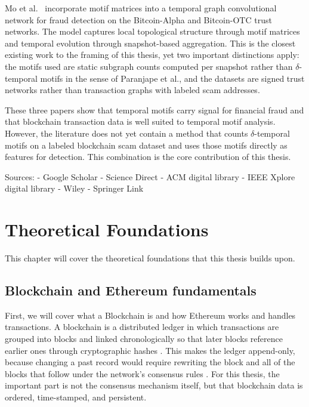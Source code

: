 \documentclass{thesisclass}
\begin{document}
Mo et al.~\cite{mo2022motifgcn} incorporate motif matrices into a
temporal graph convolutional network for fraud detection on the
Bitcoin-Alpha and Bitcoin-OTC trust networks. The model captures local
topological structure through motif matrices and temporal evolution
through snapshot-based aggregation. This is the closest existing work to
the framing of this thesis, yet two important distinctions apply: the
motifs used are static subgraph counts computed per snapshot rather than
$\delta$-temporal motifs in the sense of Paranjape et al., and the
datasets are signed trust networks rather than transaction graphs with
labeled scam addresses.

These three papers show that temporal motifs carry signal for financial fraud and that blockchain
transaction data is well suited to temporal motif analysis. However, the
literature does not yet contain a method that counts $\delta$-temporal
motifs on a labeled blockchain scam dataset and uses those motifs directly as features for detection. This combination is the
core contribution of this thesis.

Sources: 
- Google Scholar
- Science Direct
- ACM digital library
- IEEE Xplore digital library
- Wiley
- Springer Link





\chapter{Theoretical Foundations}
This chapter will cover the theoretical foundations that this thesis builds upon.

\section{Blockchain and Ethereum fundamentals}
First, we will cover what a Blockchain is and how Ethereum works and handles transactions. 
A blockchain is a distributed ledger in which transactions are grouped into blocks and linked chronologically so that later blocks reference earlier ones through cryptographic hashes \cite{nakamoto2008bitcoin, buterin2014ethereum}. This makes the ledger append-only, because changing a past record would require rewriting the block and all of the blocks that follow under the network’s consensus rules \cite{nakamoto2008bitcoin}. For this thesis, the important part is not the consensus mechanism itself, but that blockchain data is ordered, time-stamped, and persistent.
\end{document}
